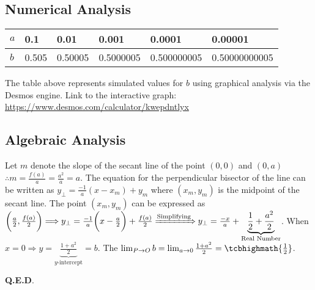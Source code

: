 \documentclass[12pt]{article}
\begin{document}
\subsection{Numerical Analysis}
\begin{table}[h]
\centering
\begin{tabular}{l||l|l|l|l|l}
$a$ & 0.1 & 0.01 & 0.001 & 0.0001 & 0.00001 \\ \hline
$b$ &  0.505   &  0.50005   &    0.5000005   & 0.500000005 &0.50000000005     \\
\end{tabular}
\end{table}
The table above represents simulated values for $b$ using graphical analysis via the Desmos engine. Link to the interactive graph: \url{https://www.desmos.com/calculator/kwepdntlyx} 
\subsection{Algebraic Analysis}
Let $m$ denote the slope of the secant line of the point $(0,0)$ and $(0,a)$ $\therefore m=\frac{f(a)}{a} = \frac{a^2}{a}=a$. The equation for the perpendicular bisector of the line can be written as $y_{\bot}=\frac{-1}{a}(x-x_m)+y_m$ where $(x_m, y_m)$ is the midpoint of the secant line. The point $(x_m, y_m)$ can be expressed as $\biggr(\frac{a}{2}, \frac{f(a)}{2}\biggr) \Longrightarrow y_{\bot}=\frac{-1}{a}\biggr(x-\frac{a}{2}\biggr)+\frac{f(a)}{2} \xRightarrow[]{\text{Simplifying}} y_{\bot}=\frac{-x}{a}+ \underbrace{\frac{1}{2}+ \frac{a^2}{2}}_{\text{Real Number}}$. When $x=0 \Longrightarrow y=\underbrace{\frac{1+a^2}{2}}_{y\text{-intercept}}=b$. The $\lim_{P\to O} b = \lim_{a\to 0} \frac{1+a^2}{2} =\tcbhighmath{\frac{1}{2}}$. 

\begin{FlushRight}
\textbf{Q.E.D}.
\end{FlushRight}
\end{document}

